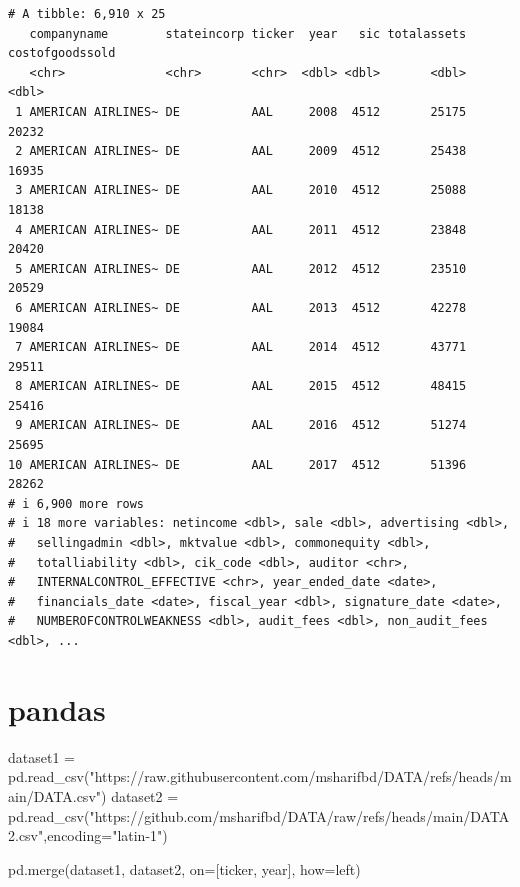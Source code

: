 \documentclass[
  letterpaper,
  DIV=11,
  numbers=noendperiod]{scrreprt}
\newenvironment{Shaded}{\begin{snugshade}}{\end{snugshade}}
\newcommand{\NormalTok}[1]{\textcolor[rgb]{0.00,0.23,0.31}{#1}}
\newcommand{\OperatorTok}[1]{\textcolor[rgb]{0.37,0.37,0.37}{#1}}
\newcommand{\StringTok}[1]{\textcolor[rgb]{0.13,0.47,0.30}{#1}}
\begin{document}
\begin{verbatim}
# A tibble: 6,910 x 25
   companyname        stateincorp ticker  year   sic totalassets costofgoodssold
   <chr>              <chr>       <chr>  <dbl> <dbl>       <dbl>           <dbl>
 1 AMERICAN AIRLINES~ DE          AAL     2008  4512       25175           20232
 2 AMERICAN AIRLINES~ DE          AAL     2009  4512       25438           16935
 3 AMERICAN AIRLINES~ DE          AAL     2010  4512       25088           18138
 4 AMERICAN AIRLINES~ DE          AAL     2011  4512       23848           20420
 5 AMERICAN AIRLINES~ DE          AAL     2012  4512       23510           20529
 6 AMERICAN AIRLINES~ DE          AAL     2013  4512       42278           19084
 7 AMERICAN AIRLINES~ DE          AAL     2014  4512       43771           29511
 8 AMERICAN AIRLINES~ DE          AAL     2015  4512       48415           25416
 9 AMERICAN AIRLINES~ DE          AAL     2016  4512       51274           25695
10 AMERICAN AIRLINES~ DE          AAL     2017  4512       51396           28262
# i 6,900 more rows
# i 18 more variables: netincome <dbl>, sale <dbl>, advertising <dbl>,
#   sellingadmin <dbl>, mktvalue <dbl>, commonequity <dbl>,
#   totalliability <dbl>, cik_code <dbl>, auditor <chr>,
#   INTERNALCONTROL_EFFECTIVE <chr>, year_ended_date <date>,
#   financials_date <date>, fiscal_year <dbl>, signature_date <date>,
#   NUMBEROFCONTROLWEAKNESS <dbl>, audit_fees <dbl>, non_audit_fees <dbl>, ...
\end{verbatim}

\section{pandas}

\begin{Shaded}
\begin{Highlighting}[]
\NormalTok{dataset1 }\OperatorTok{=}\NormalTok{ pd.read\_csv(}\StringTok{"https://raw.githubusercontent.com/msharifbd/DATA/refs/heads/main/DATA.csv"}\NormalTok{)}
\NormalTok{dataset2 }\OperatorTok{=}\NormalTok{ pd.read\_csv(}\StringTok{"https://github.com/msharifbd/DATA/raw/refs/heads/main/DATA2.csv"}\NormalTok{,encoding}\OperatorTok{=}\StringTok{"latin{-}1"}\NormalTok{)}
\end{Highlighting}
\end{Shaded}

\begin{Shaded}
\begin{Highlighting}[]
\NormalTok{pd.merge(dataset1, dataset2, on}\OperatorTok{=}\NormalTok{[}\StringTok{\textquotesingle{}ticker\textquotesingle{}}\NormalTok{, }\StringTok{\textquotesingle{}year\textquotesingle{}}\NormalTok{], how}\OperatorTok{=}\StringTok{\textquotesingle{}left\textquotesingle{}}\NormalTok{)}
\end{Highlighting}
\end{Shaded}
\end{document}
